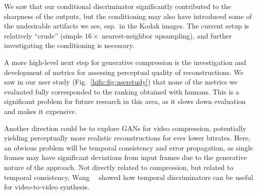 We saw that our conditional discriminator significantly contributed to the
sharpness of the outputs, but the conditioning may also have introduced some of
the undesirable artifacts we see, esp.\ in the Kodak images. The current setup
is relatively ``crude'' (simple $16{\times}$ nearest-neighbor upsampling), and
further investigating the conditioning is necessary.

A more high-level next step for generative compression is the investigation and
development of metrics for assessing perceptual quality of reconstructions. We
saw in our user study (Fig.~\ref{hific:fig:userstudy}) that none of the metrics
we evaluated fully corresponded to the ranking obtained with humans. This is a
significant problem for future research in this area, as it slows down
evaluation and makes it expensive.

Another direction could be to explore GANs for video compression, potentially
yielding perceptually more realistic reconstructions for ever lower bitrates.
Here, an obvious problem will be temporal consistency and error propagation, as
single frames may have significant deviations from input frames due to the
generative nature of the approach. Not directly related to compression, but
related to temporal consistency, Wang~\etal~\cite{wang2018video} showed how
temporal discriminators can be useful for video-to-video synthesis.

